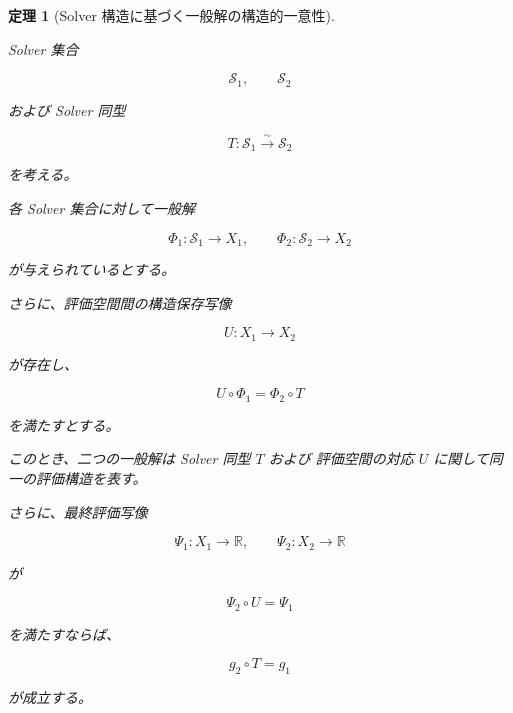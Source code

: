 \documentclass[a4paper,11pt]{article}
\newtheorem{theorem}[definition]{定理}
\newcommand{\Solver}{\mathcal{S}}
\newcommand{\R}{\mathbb{R}}
\begin{document}
\begin{theorem}[Solver 構造に基づく一般解の構造的一意性]
\label{thm:E-general-solution-uniqueness}

Solver 集合

\begin{equation}
    \Solver_1,
    \qquad
    \Solver_2
\end{equation}

および Solver 同型

\begin{equation}
    T:
    \Solver_1
    \overset{\sim}{\longrightarrow}
    \Solver_2
\end{equation}

を考える。

各 Solver 集合に対して一般解

\begin{equation}
    \Phi_1:
    \Solver_1\to X_1,
    \qquad
    \Phi_2:
    \Solver_2\to X_2
\end{equation}

が与えられているとする。

さらに、評価空間間の構造保存写像

\begin{equation}
    U:
    X_1\to X_2
\end{equation}

が存在し、

\begin{equation}
    U\circ\Phi_1
    =
    \Phi_2\circ T
    \label{eq:E-theorem-hypothesis-1}
\end{equation}

を満たすとする。

このとき、二つの一般解は Solver 同型 $T$ および
評価空間の対応 $U$ に関して同一の評価構造を表す。

さらに、最終評価写像

\begin{equation}
    \Psi_1:X_1\to\R,
    \qquad
    \Psi_2:X_2\to\R
\end{equation}

が

\begin{equation}
    \Psi_2\circ U
    =
    \Psi_1
    \label{eq:E-theorem-hypothesis-2}
\end{equation}

を満たすならば、

\begin{equation}
    g_2\circ T
    =
    g_1
\end{equation}

が成立する。
\end{theorem}
\end{document}
